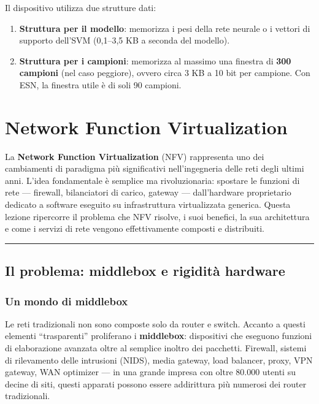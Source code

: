 \documentclass[
  italian,
  openany]{book}
\providecommand{\tightlist}{%
  \setlength{\itemsep}{0pt}\setlength{\parskip}{0pt}}
\begin{document}
Il dispositivo utilizza due strutture dati:

\begin{enumerate}
\def\labelenumi{\arabic{enumi}.}
\tightlist
\item
  \textbf{Struttura per il modello}: memorizza i pesi della rete neurale
  o i vettori di supporto dell'SVM (0,1--3,5 KB a seconda del modello).
\item
  \textbf{Struttura per i campioni}: memorizza al massimo una finestra
  di \textbf{300 campioni} (nel caso peggiore), ovvero circa 3 KB a 10
  bit per campione. Con ESN, la finestra utile è di soli 90 campioni.
\end{enumerate}

\newpage

\chapter{Network Function
Virtualization}\label{network-function-virtualization}

La \textbf{Network Function Virtualization} (NFV) rappresenta uno dei
cambiamenti di paradigma più significativi nell'ingegneria delle reti
degli ultimi anni. L'idea fondamentale è semplice ma rivoluzionaria:
spostare le funzioni di rete --- firewall, bilanciatori di carico,
gateway --- dall'hardware proprietario dedicato a software eseguito su
infrastruttura virtualizzata generica. Questa lezione ripercorre il
problema che NFV risolve, i suoi benefici, la sua architettura e come i
servizi di rete vengono effettivamente composti e distribuiti.

\begin{center}\rule{0.5\linewidth}{0.5pt}\end{center}

\section{Il problema: middlebox e rigidità
hardware}\label{il-problema-middlebox-e-rigidituxe0-hardware}

\subsection{Un mondo di middlebox}\label{un-mondo-di-middlebox}

Le reti tradizionali non sono composte solo da router e switch. Accanto
a questi elementi ``trasparenti'' proliferano i \textbf{middlebox}:
dispositivi che eseguono funzioni di elaborazione avanzata oltre al
semplice inoltro dei pacchetti. Firewall, sistemi di rilevamento delle
intrusioni (NIDS), media gateway, load balancer, proxy, VPN gateway, WAN
optimizer --- in una grande impresa con oltre 80.000 utenti su decine di
siti, questi apparati possono essere addirittura più numerosi dei router
tradizionali.
\end{document}

